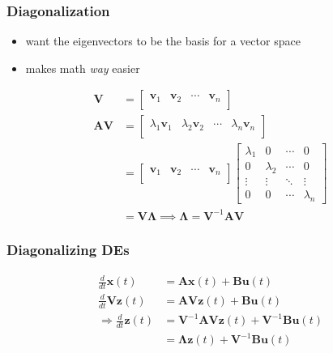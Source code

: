 \documentclass[aspectratio=169]{beamer}
\newcommand{\diff}[1]{\frac{d}{d #1}}
\begin{document}
\begin{frame}
    \frametitle{Diagonalization}

    \begin{itemize}
        \item want the eigenvectors to be the basis for a vector space
        \item makes math \emph{way} easier
    \end{itemize} \pause
    \begin{align}
        \bm{V} &=
        \begin{bmatrix}
            \bm{v}_1 & \bm{v}_2 & \cdots & \bm{v}_n \\
        \end{bmatrix} \\
        \bm{AV} &=
        \begin{bmatrix}
            \lambda_1 \bm{v}_1 & \lambda_2 \bm{v}_2 & \cdots & \lambda_n \bm{v}_n \\
        \end{bmatrix} \\
        &=
        \begin{bmatrix}
            \bm{v}_1 & \bm{v}_2 & \cdots & \bm{v}_n \\
        \end{bmatrix}
        \begin{bmatrix}
            \lambda_1 & 0 & \cdots & 0 \\
            0 & \lambda_2 & \cdots & 0 \\
            \vdots & \vdots & \ddots & \vdots \\
            0 & 0 & \cdots & \lambda_n
        \end{bmatrix} \\
        &= \bm{V \Lambda} \implies \bm{\Lambda} = \bm{V}^{-1} \bm{AV}
    \end{align}
\end{frame}

\begin{frame}
    \frametitle{Diagonalizing DEs}

    \begin{align}
        \diff{t} \bm{x}(t) &= \bm{Ax}(t) + \bm{Bu}(t) \\
        \diff{t} \bm{Vz}(t) &= \bm{AVz}(t) + \bm{Bu}(t) \\
        \Rightarrow \diff{t} \bm{z}(t) &= \bm{V}^{-1} \bm{AVz}(t) + \bm{V}^{-1} \bm{Bu}(t) \\
        &= \bm{\Lambda z}(t) + \bm{V}^{-1} \bm{Bu}(t)
    \end{align}
\end{frame}
\end{document}
